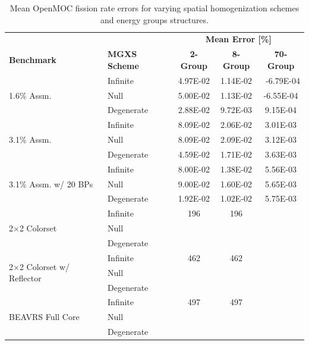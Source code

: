 \begin{table}[h!]
  \centering
  \caption[Mean OpenMOC fission rate errors]{Mean OpenMOC fission rate errors for varying spatial homogenization schemes and energy groups structures.}
  \small
  \label{table:chap8-openmoc-mean-fiss-rates}
  \vspace{6pt}
  \begin{tabular}{l l c c c}
  \toprule
  \rowcolor{lightgray}
  & & \multicolumn{3}{c}{\cellcolor{lightgray} \textbf{Mean Error [\%]}} \\
  \multirow{-2}{*}{\cellcolor{lightgray} \bf Benchmark} &
  \multirow{-2}{*}{\cellcolor{lightgray} \bf \ac{MGXS} Scheme} &
  {\cellcolor{lightgray} \bf 2-Group} &
  {\cellcolor{lightgray} \bf 8-Group} &
  {\cellcolor{lightgray} \bf 70-Group} \\
  \midrule
\multirow{3}{*}{\parbox{2.5cm}{1.6\% Assm.}} & Infinite & 4.97E-02 & 1.14E-02 &\
 -6.79E-04 \\
& Null & 5.00E-02 & 1.13E-02 & -6.55E-04 \\
& Degenerate & 2.88E-02 & 9.72E-03 & 9.15E-04 \\
  \midrule
  \multirow{3}{*}{\parbox{2.5cm}{3.1\% Assm.}} & Infinite & 8.09E-02 & 2.06E-02 & 3.01E-03 \\
& Null & 8.09E-02 & 2.09E-02 & 3.12E-03 \\
& Degenerate & 4.59E-02 & 1.71E-02 & 3.63E-03 \\
  \midrule
  \multirow{3}{*}{\parbox{2cm}{3.1\% Assm. w/ 20 BPs}} & Infinite & 8.00E-02 & 1.38E-02 & 5.56E-03 \\
& Null & 9.00E-02 & 1.60E-02 & 5.65E-03 \\
& Degenerate & 1.92E-02 & 1.02E-02 & 5.75E-03 \\
  \midrule
  \multirow{3}{*}{\parbox{2.5cm}{2$\times$2 Colorset}} & Infinite & 196 & 196 & \\
  & Null & & & \\
  & Degenerate & & & \\
  \midrule
  \multirow{3}{*}{\parbox{2.3cm}{2$\times$2 Colorset w/ Reflector}} & Infinite & 462 & 462 & \\
  & Null & & & \\
  & Degenerate & & & \\
  \midrule
  \multirow{3}{*}{\parbox{2cm}{\ac{BEAVRS} Full Core}} & Infinite & 497 & 497 & \\
  & Null & & & \\
  & Degenerate & & & \\
  \bottomrule
\end{tabular}
\end{table}

